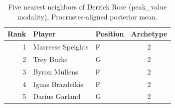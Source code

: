 \begin{table}[htbp]
  \centering\small
  \begin{tabular}{rllc}
    \toprule
    Rank & Player & Position & Archetype \\
    \midrule
    1 & Marreese Speights & F & 2 \\
    2 & Trey Burke & G & 2 \\
    3 & Byron Mullens & F & 2 \\
    4 & Ignas Brazdeikis & F & 2 \\
    5 & Darius Garland & G & 2 \\
    \bottomrule
  \end{tabular}
  \caption{Five nearest neighbors of Derrick Rose (peak_value modality), Procrustes-aligned posterior mean.}
  \label{tab:Derrick_Rose_neighbors_peak_value}
\end{table}

